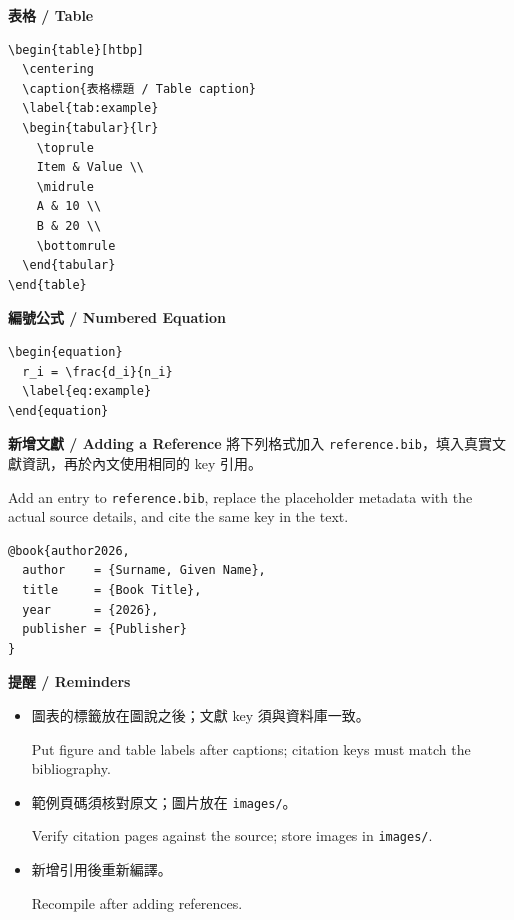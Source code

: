 \documentclass[11pt,a4paper]{article}
\begin{document}
\noindent\begin{minipage}{\linewidth}
\textbf{表格 / Table}
\begin{verbatim}
\begin{table}[htbp]
  \centering
  \caption{表格標題 / Table caption}
  \label{tab:example}
  \begin{tabular}{lr}
    \toprule
    Item & Value \\
    \midrule
    A & 10 \\
    B & 20 \\
    \bottomrule
  \end{tabular}
\end{table}
\end{verbatim}
\end{minipage}\par\medskip

\noindent\textbf{編號公式 / Numbered Equation}
\begin{verbatim}
\begin{equation}
  r_i = \frac{d_i}{n_i}
  \label{eq:example}
\end{equation}
\end{verbatim}

\noindent\textbf{新增文獻 / Adding a Reference}
將下列格式加入 \texttt{reference.bib}，填入真實文獻資訊，再於內文使用相同的 key 引用。

Add an entry to \texttt{reference.bib}, replace the placeholder metadata with the actual source details, and cite the same key in the text.
\begin{verbatim}
@book{author2026,
  author    = {Surname, Given Name},
  title     = {Book Title},
  year      = {2026},
  publisher = {Publisher}
}
\end{verbatim}

\noindent\textbf{提醒 / Reminders}
\begin{itemize}
  \item 圖表的標籤放在圖說之後；文獻 key 須與資料庫一致。\par
  Put figure and table labels after captions; citation keys must match the bibliography.
  \item 範例頁碼須核對原文；圖片放在 \texttt{images/}。\par
  Verify citation pages against the source; store images in \texttt{images/}.
  \item 新增引用後重新編譯。\par
  Recompile after adding references.
\end{itemize}
\end{document}
